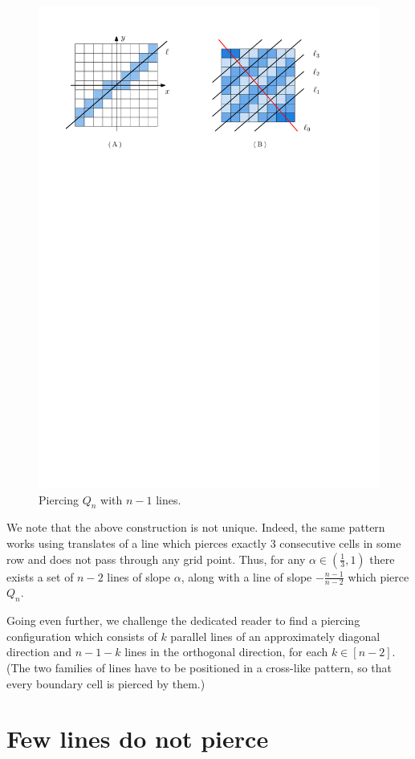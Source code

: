 \documentclass[11pt,a4paper]{amsart}
\begin{document}
\begin{figure}[h]
   \centering
  \includegraphics[width = 0.8 \textwidth]{Figures/chess1.pdf}
  \caption{Piercing $Q_n$ with $n-1$ lines. }
    \label{fig1}
\end{figure}



We note that the above construction is not unique. Indeed, the same pattern works using translates of a line which pierces exactly 3 consecutive cells in some row and does not pass through any grid point.
Thus, for any $\alpha \in (\frac 1 3, 1)$ there exists a set of $n-2$ lines of slope $\alpha$, along with a line of slope $-\frac{n-1}{n-2}$ which pierce $Q_n$.

Going even further, we challenge the dedicated reader to find a piercing configuration which consists of $k$ parallel lines of an approximately diagonal direction and $n - 1 - k$ lines in the orthogonal direction, for each $k \in [n-2]$. (The two families of lines have to be positioned in a cross-like pattern, so that every boundary cell is pierced by them.)

\section{Few lines do not pierce}
\end{document}
